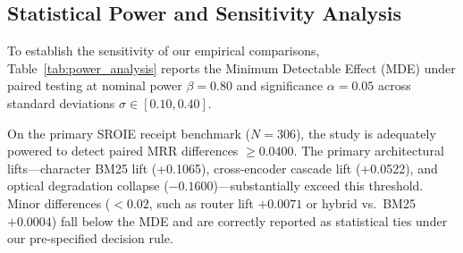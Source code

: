 \documentclass[conference]{IEEEtran}
\begin{document}
\subsection{Statistical Power and Sensitivity Analysis}
To establish the sensitivity of our empirical comparisons, Table~\ref{tab:power_analysis} reports the Minimum Detectable Effect (MDE) under paired testing at nominal power $\beta = 0.80$ and significance $\alpha = 0.05$ across standard deviations $\sigma \in [0.10, 0.40]$.

\begin{table}[h]
\centering
\small
\caption{Statistical Power and Minimum Detectable Effect (MDE) at 80\% Power ($\alpha=0.05$, Two-Sided Paired Test).}
\label{tab:power_analysis}
\end{table}

On the primary SROIE receipt benchmark ($N=306$), the study is adequately powered to detect paired MRR differences $\ge 0.0400$. The primary architectural lifts—character BM25 lift (+0.1065), cross-encoder cascade lift (+0.0522), and optical degradation collapse ($-0.1600$)—substantially exceed this threshold. Minor differences ($<0.02$, such as router lift $+0.0071$ or hybrid vs.\ BM25 $+0.0004$) fall below the MDE and are correctly reported as statistical ties under our pre-specified decision rule.
\end{document}
